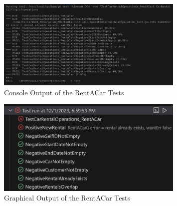 \begin{figure}
      \centering
      \includegraphics[width=0.8\textwidth]{figures/goLang/carRental/carRentalCLI/carRentalCLI_testingConsoleOutput.png}
      \caption{Console Output of the RentACar Tests}
      \label{fig:carRentalCLI_testingConsoleOutput}
\end{figure}
\begin{figure}
      \centering
      \includegraphics[width=0.8\textwidth]{figures/goLang/carRental/carRentalCLI/carRentalCLI_testingGraphicalOutput.png}
      \caption{Graphical Output of the RentACar Tests}
      \label{fig:carRentalCLI_testingGraphicalOutput}
\end{figure}



